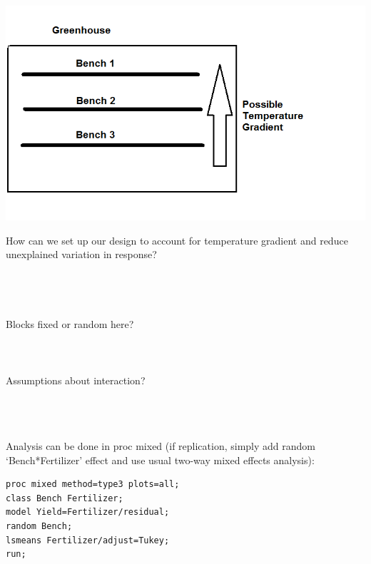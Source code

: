 \begin{center}
    \includegraphics[scale=0.45]{layout1.png}
\end{center}

How can we set up our design to account for temperature gradient and reduce unexplained variation in response?\\~\\~\\~\\~\\
Blocks fixed or random here?\\~\\~\\~\\
Assumptions about interaction?\\~\\~\\~\\

\newpage

Analysis can be done in proc mixed (if replication, simply add random `Bench*Fertilizer' effect and use usual two-way mixed effects analysis):
\begin{small}
\begin{verbatim}
proc mixed method=type3 plots=all;
class Bench Fertilizer;
model Yield=Fertilizer/residual;
random Bench;
lsmeans Fertilizer/adjust=Tukey;
run;
\end{verbatim}
\end{small}

